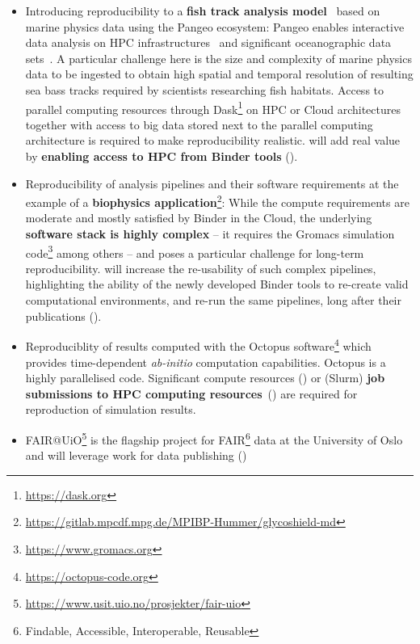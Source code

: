\begin{itemize}
\item Introducing reproducibility to a \textbf{fish track analysis model}~\cite{woillez2016} based on
  marine physics data using the Pangeo ecosystem:
  Pangeo enables interactive data analysis on HPC infrastructures~\cite{odaka2020}
  and significant oceanographic data sets~\cite{maze2020}.
  A particular challenge here is
  the size and complexity of marine physics data to be ingested
  to obtain high spatial and temporal resolution of resulting sea bass tracks
  required by scientists researching fish habitats.
  Access to parallel computing resources through Dask\footnote{\url{https://dask.org}} on HPC or
  Cloud architectures together with access to big data stored next to the
  parallel computing architecture is required to make reproducibility realistic.
  \TheProject will add real value by \textbf{enabling access to HPC from Binder tools} ().
\item Reproducibility of analysis pipelines and their software
  requirements at the example of a
  \textbf{biophysics application}\footnote{\url{https://gitlab.mpcdf.mpg.de/MPIBP-Hummer/glycoshield-md}}:
  While the compute requirements are moderate and mostly satisfied by Binder in the Cloud,
  the underlying \textbf{software stack is highly complex} -- it requires the Gromacs simulation
  code\footnote{\url{https://www.gromacs.org}} among others
  -- and poses a particular challenge for long-term reproducibility.
  \TheProject will increase the re-usability of such complex pipelines,
  highlighting the ability of the newly developed Binder tools to re-create valid computational environments,
  and re-run the same pipelines, long after their publications ().
\item Reproduciblity of results computed with the
  Octopus software\footnote{\url{https://octopus-code.org}}
  which provides time-dependent \emph{ab-initio} computation capabilities.
  Octopus is a highly parallelised code. Significant compute resources
  () or
  (Slurm) \textbf{job submissions to HPC computing
  resources}~() are required for
  reproduction of simulation results.
\item FAIR@UiO\footnote{\url{https://www.usit.uio.no/prosjekter/fair-uio}} is the flagship project for FAIR\footnote{Findable, Accessible, Interoperable, Reusable}
  data at the University of Oslo and will leverage \TheProject work for data publishing ()

\end{itemize}
